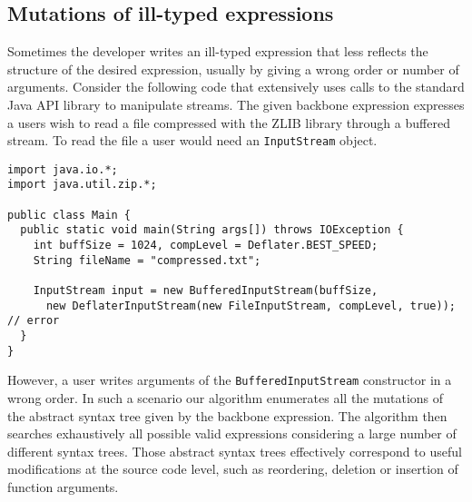 \subsection{Mutations of ill-typed expressions}


Sometimes the developer writes an ill-typed expression that less reflects
the structure of the desired expression, usually by giving a wrong order
or number of arguments. Consider the following code that extensively uses
calls to the standard Java API library to manipulate streams.
The given backbone expression expresses a users wish to read a file 
compressed with the ZLIB library through a buffered stream.
To read the file a user would need an \lstinline{InputStream} object.
\begin{lstlisting}
import java.io.*;
import java.util.zip.*;

public class Main {
  public static void main(String args[]) throws IOException {
    int buffSize = 1024, compLevel = Deflater.BEST_SPEED;
    String fileName = "compressed.txt";
    
    InputStream input = new BufferedInputStream(buffSize,
      new DeflaterInputStream(new FileInputStream, compLevel, true)); // error
  }
}
\end{lstlisting}

However, a user writes arguments of the \lstinline{BufferedInputStream} constructor in a wrong order.
In such a scenario our algorithm enumerates all the mutations of the abstract syntax
tree given by the backbone expression. The algorithm then searches exhaustively
all possible valid expressions considering a large number of different syntax trees.
Those abstract syntax trees effectively correspond to useful modifications
at the source code level, such as reordering, deletion or insertion of function arguments.

